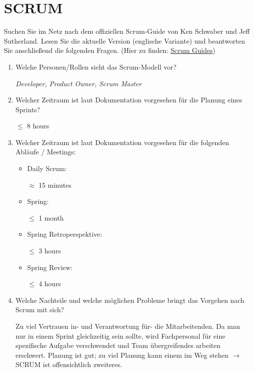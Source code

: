 \documentclass{article}
\newcommand{\gqq}[1]{\glqq{}#1\grqq{}}
\begin{document}
    \newpage
    \section{SCRUM}
    Suchen Sie im Netz nach dem offiziellen Scrum-Guide von Ken Schwaber und Jeff Sutherland.
    Lesen Sie die aktuelle Version (englische Variante) und beantworten Sie anschließend die folgenden Fragen. (Hier zu finden: \href{https://scrumguides.org/}{Scrum Guides})

    \begin{enumerate}[label=\alph*.]
        \item Welche Personen/Rollen sieht das Scrum-Modell vor?
        
            \emph{Developer, Product Owner, Scrum Master}
        \item Welcher Zeitraum ist laut Dokumentation vorgesehen für die Planung eines Sprints?
        
            $\leq$ 8 hours
        \item Welcher Zeitraum ist laut Dokumentation vorgesehen für die folgenden Abläufe / Meetings:
        
            \begin{itemize}[label=◦]
                \item Daily Scrum:
                
                $\approx$ 15 minutes
                \item Spring:
                
                $\leq$ 1 month
                \item Spring Retroperspektive:
                
                $\leq$ 3 hours
                \item Spring Review:
                
                $\leq$ 4 hours
            \end{itemize}
        \item Welche Nachteile und welche möglichen Probleme bringt das Vorgehen nach Scrum mit sich?
        
            Zu viel Vertrauen in- und Verantwortung für- die Mitarbeitenden.
            Da man nur in einem Sprint gleichzeitig sein sollte, wird Fachpersonal für eine spezifische Aufgabe \gqq{verschwendet} und Team übergreifendes arbeiten erschwert.
            Planung ist gut; zu viel Planung kann einem im Weg stehen $\to$ SCRUM ist offensichtlich zweiteres.
    \end{enumerate}
\end{document}
